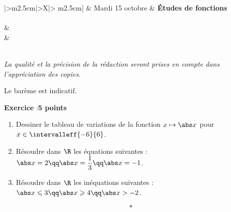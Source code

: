 \documentclass[10pt,french]{book}
\newcounter{exoc}
\newenvironment{exoc}[1]{%
  \refstepcounter{exoc}\textbf{Exercice \theexoc} :\hfill {\textbf{#1}}\par
  \medskip}%
{\medskip}
\begin{document}
\begin{center}
\end{center}

\clearpage\setcounter{exoc}{0}



\begin{center}
\begin{tabularx}{\textwidth}{|>\centering m{2.5cm}|>\centering X|>{\centering\arraybackslash} m{2.5cm}|}
	\iere {} & Mardi 15 octobre  & \textbf{\'Etudes de fonctions} \\
	\hline
		 \\
	\hline
         &  \\
		 &  \\
	\hline
         \\[1cm]
    \hline
\end{tabularx}\bigskip

{\itshape
La qualité et la précision de la rédaction seront prises en compte dans l'appréciation des copies.\par
Le barème est indicatif.}
\end{center}

\begin{exoc}{5 points}
    \begin{enumerate}
        \item Dessiner le tableau de variations de la fonction $x \mapsto \abs x$ pour $x \in \intervalleff{-6}{6}$.
        \item Résoudre dans $\R$ les équations suivantes : $\abs x = 2 \qq \abs x = \dfrac 13 \qq \abs x = -1$.
        \item Résoudre dans $\R$ les inéquations suivantes : $\abs x \leqslant 3 \qq \abs x \geqslant 4 \qq \abs x > -2$.
    \end{enumerate}\[*\]
\end{exoc}
\end{document}
